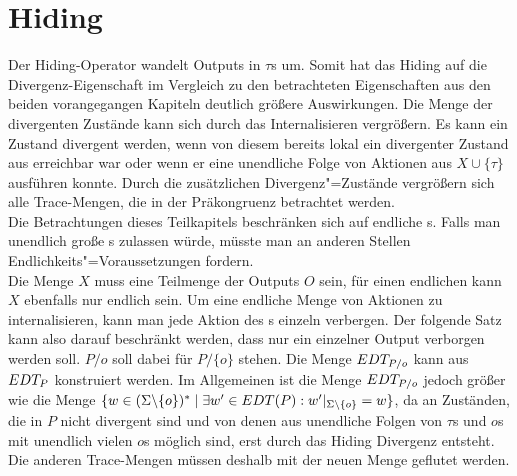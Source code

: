 \section{Hiding}

Der Hiding-Operator wandelt Outputs in $\tau$s um. Somit hat das Hiding auf die
Divergenz-Eigenschaft im Vergleich zu den betrachteten Eigenschaften aus den
beiden vorangegangen Kapiteln deutlich größere Auswirkungen. Die Menge der
divergenten Zustände kann sich durch das Internalisieren vergrößern. Es kann
ein Zustand divergent werden, wenn von diesem bereits lokal ein divergenter
Zustand aus erreichbar war oder wenn er eine unendliche Folge von Aktionen aus
$X\cup \{\tau\}$ ausführen konnte. Durch die zusätzlichen Divergenz"=Zustände
vergrößern sich alle Trace-Mengen, die in der Präkongruenz \DRel{} betrachtet
werden.\\
Die Betrachtungen dieses Teilkapitels beschränken sich auf endliche \MEIO{}s.
Falls man unendlich große \MEIO{}s zulassen würde, müsste man an anderen
Stellen Endlichkeits"=Voraussetzungen fordern.\\
Die Menge $X$ muss eine Teilmenge der Outputs $O$ sein, für einen endlichen
\MEIO{} kann $X$ ebenfalls nur endlich sein. Um eine endliche Menge von
Aktionen zu internalisieren, kann man jede Aktion des \MEIO{}s einzeln
verbergen. Der folgende Satz kann also darauf beschränkt werden, dass
nur ein einzelner Output verborgen werden soll. $P/o$ soll dabei für $P/\{o\}$
stehen. Die Menge $EDT _{P/o}$ kann aus $EDT _P$ konstruiert werden. Im
Allgemeinen ist die Menge $EDT _{P/o}$ jedoch größer wie die Menge $\{w\in
(\Sigma\backslash \{o\})^*\mid \exists w'\in EDT(P): w'|_{\Sigma\backslash
\{o\}} = w\}$, da an Zuständen, die in $P$ nicht divergent sind und von denen
aus unendliche Folgen von $\tau$s und $o$s mit unendlich vielen $o$s möglich
sind, erst durch das Hiding Divergenz entsteht. Die anderen Trace-Mengen müssen
deshalb mit der neuen \EDT{} Menge geflutet werden.



